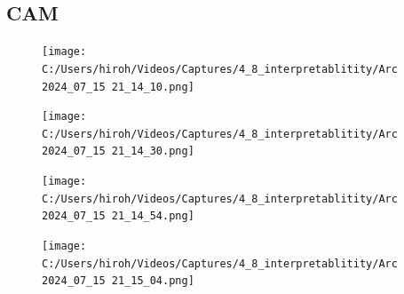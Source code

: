 \documentclass{ltjsarticle}
\begin{document}
\subsection{CAM}
\begin{figure}[htbp]
  \centering
  \texttt{[image: C:/Users/hiroh/Videos/Captures/4\_8\_interpretablitity/Arc 2024\_07\_15 21\_14\_10.png]}
\end{figure}
\begin{figure}[htbp]
  \centering
  \texttt{[image: C:/Users/hiroh/Videos/Captures/4\_8\_interpretablitity/Arc 2024\_07\_15 21\_14\_30.png]}
\end{figure}
\begin{figure}[htbp]
  \centering
  \texttt{[image: C:/Users/hiroh/Videos/Captures/4\_8\_interpretablitity/Arc 2024\_07\_15 21\_14\_54.png]}
\end{figure}
\begin{figure}[htbp]
  \centering
  \texttt{[image: C:/Users/hiroh/Videos/Captures/4\_8\_interpretablitity/Arc 2024\_07\_15 21\_15\_04.png]}
\end{figure}

\newpage
\end{document}
